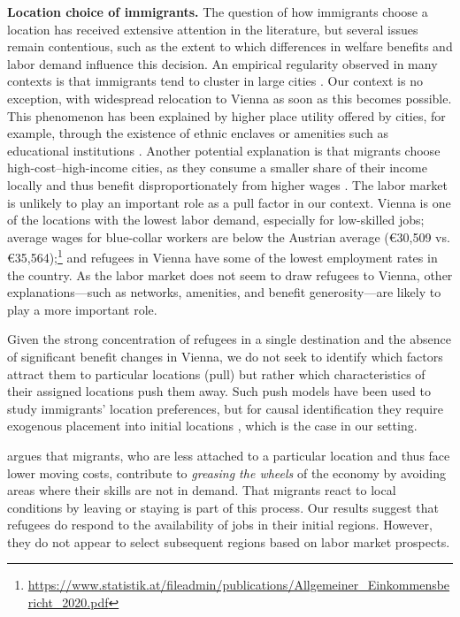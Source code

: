 \textbf{Location choice of immigrants.} The question of how immigrants choose a location has received extensive attention in the literature, but several issues remain contentious, such as the extent to which differences in welfare benefits and labor demand influence this decision. An empirical regularity observed in many contexts is that immigrants tend to cluster in large cities \citep{monras2023}. Our context is no exception, with widespread relocation to Vienna as soon as this becomes possible. This phenomenon has been explained by higher place utility offered by cities, for example, through the existence of ethnic enclaves or amenities such as educational institutions \citep{damm2010}. Another potential explanation is that migrants choose high-cost–high-income cities, as they consume a smaller share of their income locally and thus benefit disproportionately from higher wages \citep{albert2022}. The labor market is unlikely to play an important role as a pull factor in our context. Vienna is one of the locations with the lowest labor demand, especially for low-skilled jobs; average wages for blue-collar workers are below the Austrian average (€30,509 vs. €35,564);\footnote{\url{https://www.statistik.at/fileadmin/publications/Allgemeiner_Einkommensbericht_2020.pdf}} and refugees in Vienna have some of the lowest employment rates in the country. As the labor market does not seem to draw refugees to Vienna, other explanations—such as networks, amenities, and benefit generosity—are likely to play a more important role.

Given the strong concentration of refugees in a single destination and the absence of significant benefit changes in Vienna, we do not seek to identify which factors attract them to particular locations (pull) but rather which characteristics of their assigned locations push them away. Such push models have been used to study immigrants’ location preferences, but for causal identification they require exogenous placement into initial locations \citep{damm2009}, which is the case in our setting.

\citet{borjas2001} argues that migrants, who are less attached to a particular location and thus face lower moving costs, contribute to \textit{greasing the wheels} of the economy by avoiding areas where their skills are not in demand. That migrants react to local conditions by leaving or staying is part of this process. Our results suggest that refugees do respond to the availability of jobs in their initial regions. However, they do not appear to select subsequent regions based on labor market prospects. %

